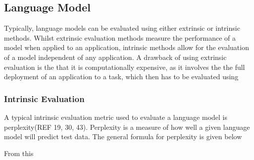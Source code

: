 \subsection{Language Model}
Typically, language models can be evaluated using either extrinsic or intrinsic methods. Whilst extrinsic evaluation methods measure the performance of a model when applied to an application, intrinsic methods allow for the evaluation of a model independent of any application. A drawback of using extrinsic evaluation is the that it is computationally expensive, as it involves the the full deployment of an application to a task, which then has to be evaluated using 
\subsubsection{Intrinsic Evaluation}
A typical intrinsic evaluation metric used to evaluate a language model is perplexity(REF 19, 30, 43). Perplexity is a measure of how well a given language model will predict test data. The general formula for perplexity is given below

\noindent
\newline
From this 

